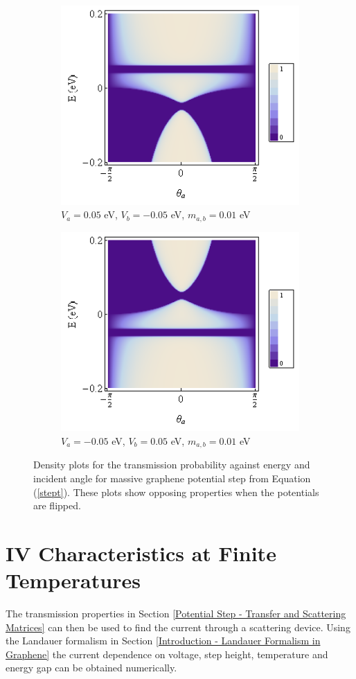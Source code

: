 		\begin{figure}[h]
			\begin{subfigure}[h]{0.5\textwidth}
				\centerline{\includegraphics[scale=0.5]{images/step-3}}
				\caption{$V_{a}=0.05$ eV, $V_{b}=-0.05$ eV, $m_{a,b}=0.01$ eV}
			\end{subfigure}
			\hspace{0.5cm}
			\begin{subfigure}[h]{0.5\textwidth}
				\centerline{\includegraphics[scale=0.5]{images/step-4}}
				\caption{$V_{a}=-0.05$ eV, $V_{b}=0.05$ eV, $m_{a,b}=0.01$ eV}
			\end{subfigure}
			\caption{Density plots for the transmission probability against energy and incident angle for massive graphene potential step from Equation (\ref{stept}). These plots show opposing properties when the potentials are flipped.}
			\label{step-3}
		\end{figure}
		\section{IV Characteristics at Finite Temperatures}
		\label{Potential Step - IV Characteristics at Finite Temperatures}
			The transmission properties in Section \ref{Potential Step - Transfer and Scattering Matrices} can then be used to find the current through a scattering device. Using the Landauer formalism in Section \ref{Introduction - Landauer Formalism in Graphene} the current dependence on voltage, step height, temperature and energy gap can be obtained numerically.
			
